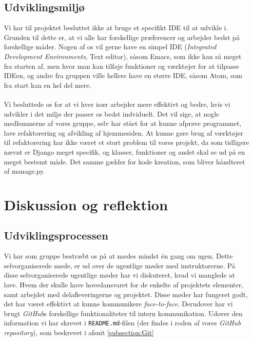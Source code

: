 \documentclass[12pt]{article}
\begin{document}
\subsection{Udviklingsmiljø}
Vi har til projektet besluttet ikke at bruge et specifikt IDE til at udvikle i. Grunden til dette er, at vi alle har forskellige præferencer og arbejder bedst på forskellige måder. Nogen af os vil gerne have en simpel IDE (\textit{Integrated Development Environments}, Text editor), såsom Emacs, som ikke kan så meget fra starten af, men hvor man kan tilføje funktioner og værktøjer for at tilpasse IDEen, og andre fra gruppen ville hellere have en større IDE, såsom Atom, som fra start kan en hel del mere. \\ \\
Vi besluttede os for at vi hver især arbejder mere effektivt og bedre, hvis vi udvikler i det miljø der passer os bedst indviduelt. Det vil sige, at nogle medlemmerne af vores gruppe, selv har stået for at kunne afprøve programmet, lave refaktorering og afvikling af hjemmesiden. At kunne gøre brug af værktøjer til refaktorering har ikke været et stort problem til vores projekt, da som tidligere nævnt er Django meget specifik, og klasser, funktioner og andet skal se ud på en meget bestemt måde. Det samme gælder for kode kreation, som bliver håndteret af manage.py.

\section{Diskussion og reflektion} %
\label{sec:diskussion}

\subsection{Udviklingsprocessen}
Vi har som gruppe bestræbt os på at mødes mindst én gang om ugen. Dette selvorganiserede møde, er ud over de ugentlige møder med instruktorerne. På disse selvorganiserede ugentlige møder har vi diskuteret, hvad vi manglede at lave. Hvem der skulle have hovedansvaret for de enkelte af projektets elementer, samt arbejdet med delafleveringerne og projektet. Disse møder har fungeret godt, det har været effektivt at kunne kommunikere \textit{face-to-face}. Derudover har vi brugt \textit{GitHub}s forskellige funktionaliteter til intern kommunikation. Udover den information vi har skrevet i \texttt{README.md}-filen (der findes i roden af vores \textit{GitHub} \textit{repository}), som beskrevet i afsnit \ref{subsection:Git}  
\end{document}
